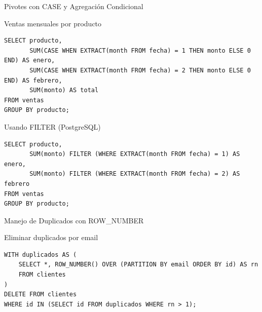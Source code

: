 \documentclass[aspectratio=169, 10pt, xcolor=table]{beamer}
\begin{document}
\begin{frame}[fragile]{Pivotes con CASE y Agregación Condicional}
    \begin{block}{Ventas mensuales por producto}
        \begin{lstlisting}
SELECT producto,
       SUM(CASE WHEN EXTRACT(month FROM fecha) = 1 THEN monto ELSE 0 END) AS enero,
       SUM(CASE WHEN EXTRACT(month FROM fecha) = 2 THEN monto ELSE 0 END) AS febrero,
       SUM(monto) AS total
FROM ventas
GROUP BY producto;
        \end{lstlisting}
    \end{block}
    \begin{block}{Usando FILTER (PostgreSQL)}
        \begin{lstlisting}
SELECT producto,
       SUM(monto) FILTER (WHERE EXTRACT(month FROM fecha) = 1) AS enero,
       SUM(monto) FILTER (WHERE EXTRACT(month FROM fecha) = 2) AS febrero
FROM ventas
GROUP BY producto;
        \end{lstlisting}
    \end{block}
\end{frame}

\begin{frame}[fragile]{Manejo de Duplicados con ROW\_NUMBER}
    \begin{block}{Eliminar duplicados por email}
        \begin{lstlisting}
WITH duplicados AS (
    SELECT *, ROW_NUMBER() OVER (PARTITION BY email ORDER BY id) AS rn
    FROM clientes
)
DELETE FROM clientes
WHERE id IN (SELECT id FROM duplicados WHERE rn > 1);
        \end{lstlisting}
    \end{block}
\end{frame}
\end{document}
